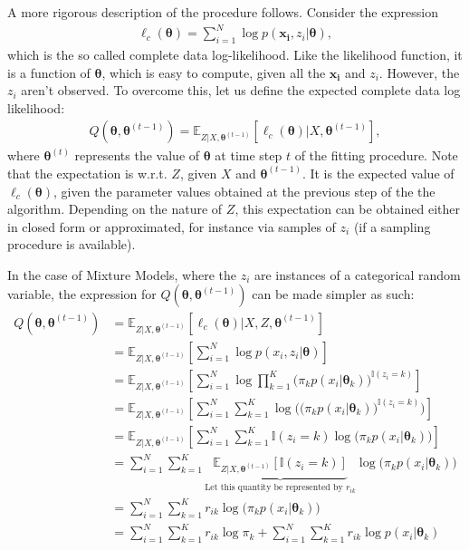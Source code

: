 A more rigorous description of the procedure follows. Consider the expression
\begin{align}
    \ell_c(\bm{\theta}) = \sum^N_{i=1} \log p(\bm{x_i}, z_i | \bm{\theta}),
\end{align} which is the so called complete data log-likelihood. Like the likelihood
function, it is a function of $\bm{\theta}$, which is easy to compute, given all
the $\bm{x_i}$ and $z_i$.
However, the $z_i$ aren't observed. To overcome this, let us define the expected
complete data log likelihood:
\begin{align}
    Q(\bm{\theta}, \bm{\theta}^{(t-1)}) = \mathbb{E}_{Z|X, \bm{\theta}^{(t-1)}}[\ell_c(\bm{\theta}) | X, \bm{\theta}^{(t-1)}],
\end{align} where $\bm{\theta}^{(t)}$ represents the value of $\bm{\theta}$ at time step
$t$ of the fitting procedure. Note that the expectation is w.r.t. $Z$, given $X$
and $\bm{\theta}^{(t-1)}$. It is the expected value of $\ell_c(\bm{\theta})$, given
the parameter values obtained at the previous step of the the algorithm. Depending
on the nature of $Z$, this expectation can be obtained either in closed form or
approximated, for instance via samples of $z_i$ (if a sampling procedure is available).

In the case of Mixture Models, where the $z_i$ are instances of a categorical
random variable, the expression for $Q(\bm{\theta}, \bm{\theta}^{(t-1)})$ can be made
simpler as such:
\begin{align}
    Q(\bm{\theta}, \bm{\theta}^{(t-1)}) &= \mathbb{E}_{Z|X, \bm{\theta}^{(t-1)}}[\ell_c(\bm{\theta}) | X, Z, \bm{\theta}^{(t-1)}] \\
    &= \mathbb{E}_{Z|X, \bm{\theta}^{(t-1)}}[\sum_{i=1}^N \log p(x_i, z_i | \bm{\theta})] \\
    &= \mathbb{E}_{Z|X, \bm{\theta}^{(t-1)}}[\sum_{i=1}^N \log \prod_{k=1}^K \big(\pi_k p(x_i | \bm{\theta}_k)\big)^{\mathbb{I}(z_i = k)}] \\
    &= \mathbb{E}_{Z|X, \bm{\theta}^{(t-1)}}[\sum_{i=1}^N \sum_{k=1}^K \log\Big(\big(\pi_k p(x_i | \bm{\theta}_k)\big)^{\mathbb{I}(z_i = k)}\Big)] \\
    &= \mathbb{E}_{Z|X, \bm{\theta}^{(t-1)}}[\sum_{i=1}^N \sum_{k=1}^K \mathbb{I}(z_i = k) \log\Big(\pi_k p(x_i | \bm{\theta}_k)\Big)] \\
    &= \sum_{i=1}^N \sum_{k=1}^K \underbrace{\mathbb{E}_{Z|X, \bm{\theta}^{(t-1)}}[\mathbb{I}(z_i = k)]}_{\text{Let this quantity be represented by $r_{ik}$}} \log\Big(\pi_k p(x_i | \bm{\theta}_k)\Big)\\
    &= \sum_{i=1}^N \sum_{k=1}^K r_{ik} \log\Big(\pi_k p(x_i | \bm{\theta}_k)\Big) \\
    &= \sum_{i=1}^N \sum_{k=1}^K r_{ik} \log\pi_k + \sum_{i=1}^N \sum_{k=1}^K r_{ik} \log p(x_i | \bm{\theta}_k) \\
\end{align}

